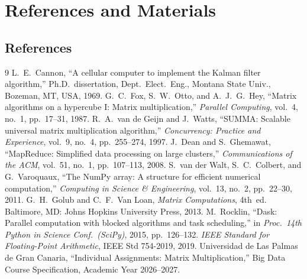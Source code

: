 \documentclass[11pt,a4paper]{article}
\begin{document}
\section{References and Materials}

\subsection{References}
\begingroup
\small
\renewcommand{\section}[2]{}%
\begin{thebibliography}{9}
\setlength{\itemsep}{1pt}
 L.~E.~Cannon, ``A cellular computer to implement the Kalman filter algorithm,'' Ph.D.\ dissertation, Dept.\ Elect.\ Eng., Montana State Univ., Bozeman, MT, USA, 1969.
 G.~C.~Fox, S.~W.~Otto, and A.~J.~G.~Hey, ``Matrix algorithms on a hypercube I: Matrix multiplication,'' \emph{Parallel Computing}, vol.~4, no.~1, pp.~17--31, 1987.
 R.~A.~van de Geijn and J.~Watts, ``SUMMA: Scalable universal matrix multiplication algorithm,'' \emph{Concurrency: Practice and Experience}, vol.~9, no.~4, pp.~255--274, 1997.
 J.~Dean and S.~Ghemawat, ``MapReduce: Simplified data processing on large clusters,'' \emph{Communications of the ACM}, vol.~51, no.~1, pp.~107--113, 2008.
 S.~van der Walt, S.~C.~Colbert, and G.~Varoquaux, ``The NumPy array: A structure for efficient numerical computation,'' \emph{Computing in Science \& Engineering}, vol.~13, no.~2, pp.~22--30, 2011.
 G.~H.~Golub and C.~F.~Van Loan, \emph{Matrix Computations}, 4th~ed. Baltimore, MD: Johns Hopkins University Press, 2013.
 M.~Rocklin, ``Dask: Parallel computation with blocked algorithms and task scheduling,'' in \emph{Proc.\ 14th Python in Science Conf.\ (SciPy)}, 2015, pp.~126--132.
 \emph{IEEE Standard for Floating-Point Arithmetic}, IEEE Std 754-2019, 2019.
 Universidad de Las Palmas de Gran Canaria, ``Individual Assignments: Matrix Multiplication,'' Big Data Course Specification, Academic Year 2026--2027.
\end{thebibliography}
\endgroup
\end{document}
